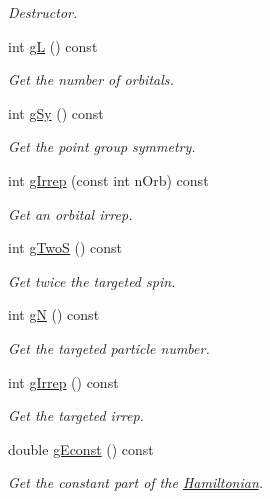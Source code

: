 \begin{DoxyCompactItemize}
\begin{DoxyCompactList}\small\item\em Destructor. \end{DoxyCompactList}\item 
int \hyperlink{classCheMPS2_1_1Problem_a3e7be26cd15d22f4e0a65a34616cbcdd}{g\-L} () const 
\begin{DoxyCompactList}\small\item\em Get the number of orbitals. \end{DoxyCompactList}\item 
int \hyperlink{classCheMPS2_1_1Problem_a15485ccb1ac98823b9e8187c16fab03f}{g\-Sy} () const 
\begin{DoxyCompactList}\small\item\em Get the point group symmetry. \end{DoxyCompactList}\item 
int \hyperlink{classCheMPS2_1_1Problem_ac09cc027ab9b41132096e9bd14b549ff}{g\-Irrep} (const int n\-Orb) const 
\begin{DoxyCompactList}\small\item\em Get an orbital irrep. \end{DoxyCompactList}\item 
int \hyperlink{classCheMPS2_1_1Problem_ad472d8f16b1014db3ae67478684b0c49}{g\-Two\-S} () const 
\begin{DoxyCompactList}\small\item\em Get twice the targeted spin. \end{DoxyCompactList}\item 
int \hyperlink{classCheMPS2_1_1Problem_a634bbc2ad8be9f45ecd894f0f222885f}{g\-N} () const 
\begin{DoxyCompactList}\small\item\em Get the targeted particle number. \end{DoxyCompactList}\item 
int \hyperlink{classCheMPS2_1_1Problem_a23de8e37ec94ded22d09328f3d628fad}{g\-Irrep} () const 
\begin{DoxyCompactList}\small\item\em Get the targeted irrep. \end{DoxyCompactList}\item 
double \hyperlink{classCheMPS2_1_1Problem_a6c6f133286114da1666965c8048e47a1}{g\-Econst} () const 
\begin{DoxyCompactList}\small\item\em Get the constant part of the \hyperlink{classCheMPS2_1_1Hamiltonian}{Hamiltonian}. \end{DoxyCompactList}\item 

\end{DoxyCompactItemize}
